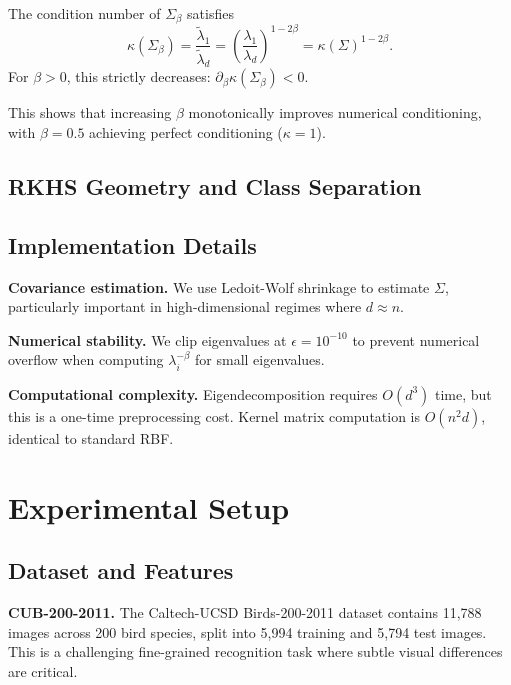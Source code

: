 \documentclass[11pt]{article}
\begin{document}
\begin{proposition}
The condition number of $\Sigma_\beta$ satisfies
\begin{equation}
    \kappa(\Sigma_\beta) = \frac{\tilde{\lambda}_1}{\tilde{\lambda}_d} = \left(\frac{\lambda_1}{\lambda_d}\right)^{1-2\beta} = \kappa(\Sigma)^{1-2\beta}.
\end{equation}
For $\beta > 0$, this strictly decreases: $\partial_\beta \kappa(\Sigma_\beta) < 0$.
\end{proposition}

This shows that increasing $\beta$ monotonically improves numerical conditioning, with $\beta=0.5$ achieving perfect conditioning ($\kappa=1$).

\subsection{RKHS Geometry and Class Separation}


\subsection{Implementation Details}

\textbf{Covariance estimation.} We use Ledoit-Wolf shrinkage \cite{ledoit2004honey} to estimate $\Sigma$, particularly important in high-dimensional regimes where $d \approx n$.

\textbf{Numerical stability.} We clip eigenvalues at $\epsilon = 10^{-10}$ to prevent numerical overflow when computing $\lambda_i^{-\beta}$ for small eigenvalues.

\textbf{Computational complexity.} Eigendecomposition requires $O(d^3)$ time, but this is a one-time preprocessing cost. Kernel matrix computation is $O(n^2 d)$, identical to standard RBF.

\section{Experimental Setup}

\subsection{Dataset and Features}

\textbf{CUB-200-2011.} The Caltech-UCSD Birds-200-2011 dataset contains 11,788 images across 200 bird species, split into 5,994 training and 5,794 test images. This is a challenging fine-grained recognition task where subtle visual differences are critical.
\end{document}
